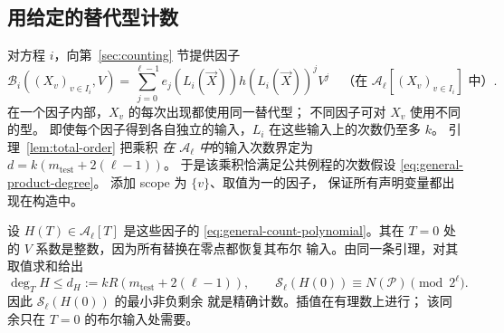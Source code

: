 \documentclass[11pt,reqno]{amsart}
\numberwithin{equation}{section}
\theoremstyle{definition}\newtheorem{definition}[theorem]{定义}
\theoremstyle{remark}\newtheorem{remark}[theorem]{注}
\renewcommand{\le}{\leqslant}
\begin{document}
\subsection{用给定的替代型计数}\label{subsec:count-polynomial}
对方程 $i$，向第~\ref{sec:counting} 节提供因子
\begin{equation}\label{eq:lifted-factor}
 \mathcal B_i((X_v)_{v\in I_i},V)
 =\sum_{j=0}^{\ell-1}e_j(L_i(\vec X))h(L_i(\vec X))^j V^j
 \quad\text{（在 }\mathcal A_\ell[(X_v)_{v\in I_i}]\text{ 中）}.
\end{equation}
在一个因子内部，$X_v$ 的每次出现都使用同一替代型；
不同因子可对 $X_v$ 使用不同的型。
即使每个因子得到各自独立的输入，$L_i$
在这些输入上的次数仍至多 $k$。
引理~\ref{lem:total-order} 把乘积
\emph{在 $\mathcal A_\ell$ 中}的输入次数界定为
$d=k(m_{\mathrm{test}}+2(\ell-1))$。
于是该乘积恰满足公共例程的次数假设
\eqref{eq:general-product-degree}。
添加 scope 为 $\{v\}$、取值为一的因子，
保证所有声明变量都出现在构造中。

设 $H(T)\in\mathcal A_\ell[T]$ 是这些因子的
\eqref{eq:general-count-polynomial}。其在 $T=0$
处的 $V$ 系数是整数，因为所有替换在零点都恢复其布尔
输入。由同一条引理，对其取值求和给出
\begin{equation}\label{eq:origin-residue}
 \deg_T H\le d_H:=kR(m_{\mathrm{test}}+2(\ell-1)),\qquad
 \mathcal S_\ell(H(0))\equiv N(\mathcal P)\pmod{2^\ell}.
\end{equation}
因此 $\mathcal S_\ell(H(0))$ 的最小非负剩余
就是精确计数。插值在有理数上进行；
该同余只在 $T=0$ 的布尔输入处需要。
\end{document}
